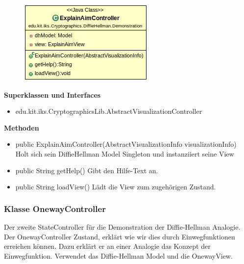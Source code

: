 \documentclass{article}
\begin{document}
      \begin{figure}[H]
        \centering
        \includegraphics[width=\textwidth]{resources/edu-kit-iks-Cryptographics-DiffieHellman-Demonstration-ExplainAimController}
      \end{figure}

      \textbf{Superklassen und Interfaces}
      \begin{itemize}
        \item edu.kit.iks.CryptographicsLib.AbstractVisualizationController
      \end{itemize}

      \textbf{Methoden}
      \begin{itemize}
          \item public ExplainAimController(AbstractVisualizationInfo visualizationInfo) \newline
              Holt sich sein DiffieHellman Model Singleton und instanziiert seine View
        \item public String getHelp() \newline
        Gibt den Hilfe-Text an.
        \item public String loadView() \newline
        Lädt die View zum zugehörigen Zustand.
      \end{itemize}

\subsubsection{Klasse OnewayController}
      Der zweite StateController für die Demonstration der Diffie-Hellman Analogie.
      Der OnewayController Zustand, erklärt wie wir dies durch Einwegfunktionen
      erreichen können. Dazu erklärt er an einer Analogie das Konzept
      der Einwegfunktion.
      Verwendet das Diffie-Hellman Model und die OnewayView.
\end{document}
